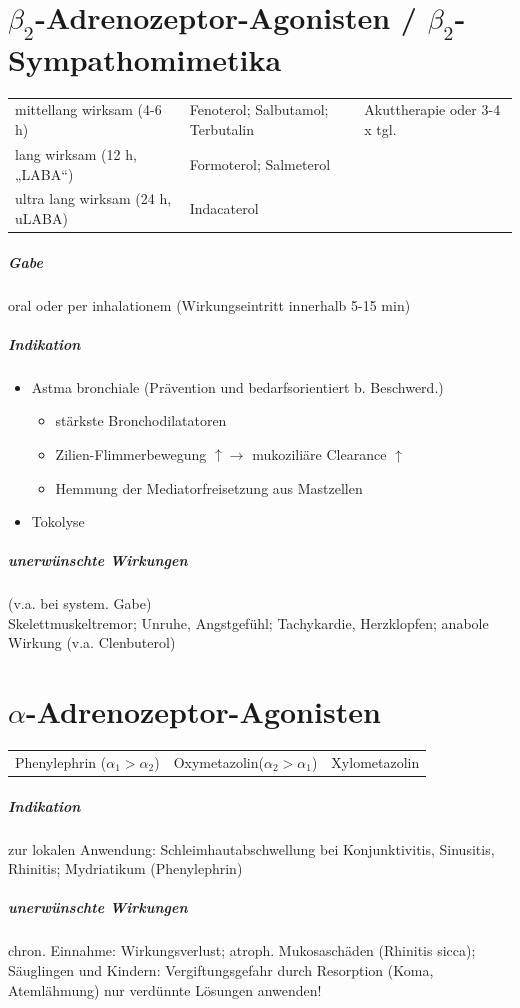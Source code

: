 \documentclass[10pt,a4paper]{report}
\begin{document}
\section{$\beta_2$-Adrenozeptor-Agonisten / $\beta_2$-Sympathomimetika }
\begin{tabularx}{\textwidth}{XXX}
mittellang wirksam (4-6 h)& Fenoterol; Salbutamol; Terbutalin&Akuttherapie oder 3-4 x tgl.\\
lang wirksam (12 h, „LABA“)&Formoterol; Salmeterol&\\ 
ultra lang wirksam (24 h, uLABA)&Indacaterol\\
\end{tabularx}
\subparagraph{Gabe} oral oder per inhalationem (Wirkungseintritt innerhalb 5-15 min) 
\subparagraph{Indikation}
\begin{itemize}
	\item Astma bronchiale (Prävention und bedarfsorientiert b. Beschwerd.)
	\begin{itemize}
		\item stärkste Bronchodilatatoren
		\item Zilien-Flimmerbewegung $\uparrow \rightarrow$ mukoziliäre Clearance $\uparrow$
		\item Hemmung der Mediatorfreisetzung aus Mastzellen
	\end{itemize}		
	\item Tokolyse
\end{itemize}
\subparagraph{unerwünschte Wirkungen}(v.a. bei system. Gabe)\\
Skelettmuskeltremor; Unruhe, Angstgefühl; Tachykardie, Herzklopfen; anabole Wirkung (v.a. Clenbuterol)
\section{$\alpha$-Adrenozeptor-Agonisten}
\begin{tabularx}{\textwidth}{XXX}
Phenylephrin  ($\alpha_1>\alpha_2$)& Oxymetazolin($\alpha_2>\alpha_1$)& Xylometazolin
\end{tabularx}
\subparagraph{Indikation}  zur lokalen Anwendung: 	Schleimhautabschwellung bei Konjunktivitis, Sinusitis, Rhinitis; Mydriatikum (Phenylephrin)
\subparagraph{unerwünschte Wirkungen}chron. Einnahme: Wirkungsverlust; atroph. Mukosaschäden  (Rhinitis sicca); Säuglingen und Kindern: Vergiftungsgefahr durch Resorption (Koma, Atemlähmung) nur verdünnte Lösungen anwenden!
\end{document}
